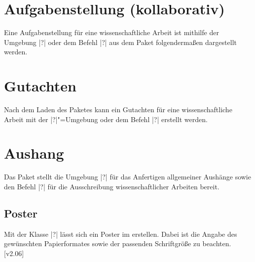 \begin{Bundle}{}
\section{Aufgabenstellung (kollaborativ)}
%
%
%
%
Eine Aufgabenstellung für eine wissenschaftliche Arbeit ist mithilfe der 
Umgebung |?| oder dem Befehl |?| aus dem 
Paket  folgendermaßen dargestellt werden.

\section{Gutachten}
%
%
%
Nach dem Laden des Paketes  kann ein Gutachten für 
eine wissenschaftliche Arbeit mit der |?|"=Umgebung 
oder dem Befehl |?| erstellt werden.

\section{Aushang}
%
%
%
Das Paket  stellt die Umgebung |?|
für das Anfertigen allgemeiner Aushänge sowie den Befehl |?|
für die Ausschreibung wissenschaftlicher Arbeiten bereit.
\end{Bundle}

\begin{Bundle}{}
\section{Poster}
%
%
%
Mit der Klasse |?| lässt sich ein Poster im \TUDCD 
erstellen. Dabei ist die Angabe des gewünschten Papierformates sowie der 
passenden Schriftgröße zu beachten.
[v2.06]
%
\end{Bundle}




